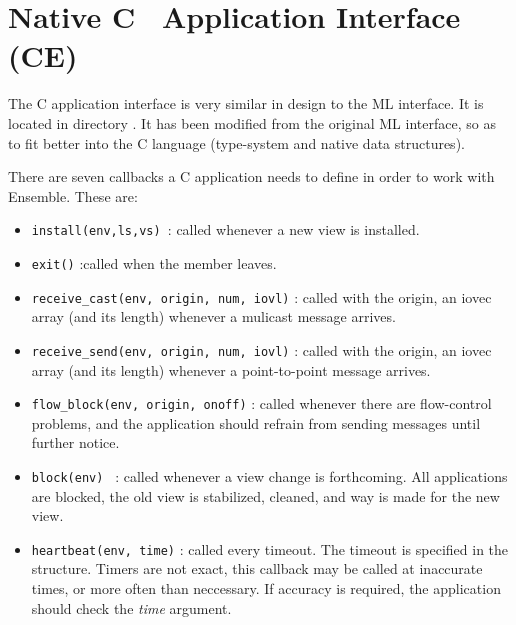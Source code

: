 %
%
%
\section{Native C \ensemble\ Application Interface (CE)}

The C application interface is very similar in design to the ML
interface. It is located in directory . It has been
modified from the original ML interface, so as to fit better into
the C language (type-system and native data structures).

There are seven callbacks a C application needs to define in order
to work with Ensemble. These are:

\begin{itemize}
\item 
{\tt install(env,ls,vs) }: called whenever a new view is installed.

\item 
{\tt exit()} :called when the member leaves. 

\item 
{\tt receive\_cast(env, origin, num, iovl)} :
called with the origin, an iovec array (and its length)
whenever a mulicast message arrives. 

\item
{\tt receive\_send(env, origin, num, iovl)} : 
called with the origin, an iovec array (and its length)
whenever a point-to-point message arrives. 

\item
{\tt flow\_block(env, origin, onoff)} : 
called whenever there are flow-control problems, and
the application should refrain from sending messages until further
notice.

\item
{\tt block(env) } : 
called whenever a view change is forthcoming. All
applications are blocked,  the old view is stabilized,
cleaned, and way is made for the new view. 

\item 
{\tt heartbeat(env, time)} : 
called every timeout. The timeout is specified in the 
structure. Timers are not exact, this callback may be called at
inaccurate times, or more often than neccessary. If accuracy is
required, the application should check the {\it time} argument. 
\end{itemize}

